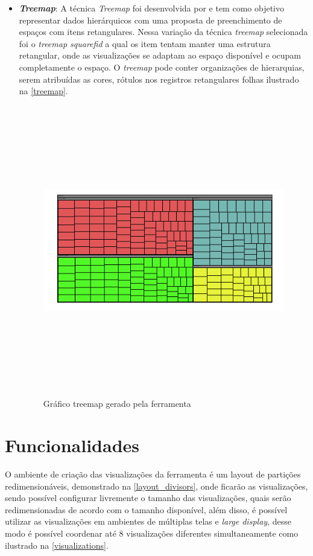 \documentclass[
	12pt,				%
	openright,			%
	oneside,			%
	a4paper,			%
	english,			%
	brazil				%
	]{abntex2}
\begin{document}
\begin{itemize}
    
    \item  \textbf{\textit{Treemap}}: A técnica  \textit{Treemap} foi desenvolvida por \cite{johnson1999tree} e tem como objetivo representar dados hierárquicos com uma proposta de preenchimento de espaços com itens retangulares. Nessa variação da técnica \textit{treemap} selecionada foi o \textit{treemap squarefid} a qual os item tentam manter uma estrutura retangular, onde as visualizações se adaptam ao espaço disponível e ocupam completamente o espaço. O \textit{treemap} pode conter organizações de hierarquias, serem atribuídas as cores, rótulos nos registros retangulares folhas ilustrado na \autoref{treemap}. 
      \begin{figure}
	\caption{\label{treemap}Gráfico treemap gerado pela ferramenta}
	\begin{center}
	    \includegraphics[width=40pc,height=30pc,size=1]{figures/treemap.pdf}
	\end{center}
\end{figure}  
    
\end{itemize}



\section{Funcionalidades}

O ambiente de criação das visualizações da ferramenta é um layout de partições redimensionáveis, demonstrado na \autoref{layout_divisors}, onde ficarão as visualizações, sendo possível configurar livremente o tamanho das visualizações, quais serão redimensionadas de acordo com o tamanho disponível, além disso, é possível utilizar as visualizações em ambientes de múltiplas telas e \textit{large display}, desse modo é  possível coordenar até 8 visualizações diferentes simultaneamente como ilustrado na \autoref{visualizations}.
\end{document}
